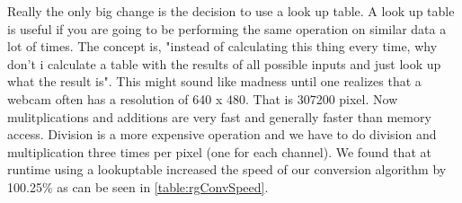 Really the only big change is the decision to use a look up table. A look up table is useful if you are going to be performing the same operation on similar data a lot of times. The concept is, "instead of calculating this thing every time, why don't i calculate a table with the results of all possible inputs and just look up what the result is". This might sound like madness until one realizes that a webcam often has a resolution of 640 x 480. That is 307200 pixel. Now mulitplications and additions are very fast and generally faster than memory access. Division is a more expensive operation and we have to do division and multiplication three times per pixel (one for each channel). We found that at runtime using a lookuptable increased the speed of our conversion algorithm by 100.25\% as can be seen in \autoref{table:rgConvSpeed}. 
